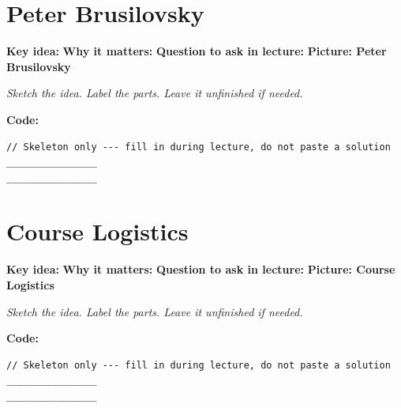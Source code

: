 \documentclass[14pt]{extarticle}
\newcommand{\deflabel}[1]{\noindent\textcolor{slotdef}{\textbf{#1}}}
\newcommand{\drawlabel}[1]{\noindent\textcolor{slotdraw}{\textbf{#1}}}
\begin{document}
\section{Peter Brusilovsky}
\Needspace{0.16\textheight}
\deflabel{Key idea:}
\vspace{1.1em}
\Needspace{0.16\textheight}
\deflabel{Why it matters:}
\vspace{1.1em}
\Needspace{0.16\textheight}
\deflabel{Question to ask in lecture:}
\vspace{1.1em}
\Needspace{0.28\textheight}
\drawlabel{Picture: Peter Brusilovsky}
{\color{slotdraw}
\begin{framed}
\color{ink}
\begin{minipage}[t][0.22\textheight]{\textwidth}
\vspace{0.4em}
\textit{Sketch the idea. Label the parts. Leave it unfinished if needed.}
\end{minipage}
\end{framed}
}
\vspace{1em}
\Needspace{0.18\textheight}
\drawlabel{Code:}
\begin{lstlisting}
// Skeleton only --- fill in during lecture, do not paste a solution
________________
________________
\end{lstlisting}
\vspace{1em}
\section{Course Logistics}
\Needspace{0.16\textheight}
\deflabel{Key idea:}
\vspace{1.1em}
\Needspace{0.16\textheight}
\deflabel{Why it matters:}
\vspace{1.1em}
\Needspace{0.16\textheight}
\deflabel{Question to ask in lecture:}
\vspace{1.1em}
\Needspace{0.28\textheight}
\drawlabel{Picture: Course Logistics}
{\color{slotdraw}
\begin{framed}
\color{ink}
\begin{minipage}[t][0.22\textheight]{\textwidth}
\vspace{0.4em}
\textit{Sketch the idea. Label the parts. Leave it unfinished if needed.}
\end{minipage}
\end{framed}
}
\vspace{1em}
\Needspace{0.18\textheight}
\drawlabel{Code:}
\begin{lstlisting}
// Skeleton only --- fill in during lecture, do not paste a solution
________________
________________
\end{lstlisting}
\vspace{1em}
\end{document}

